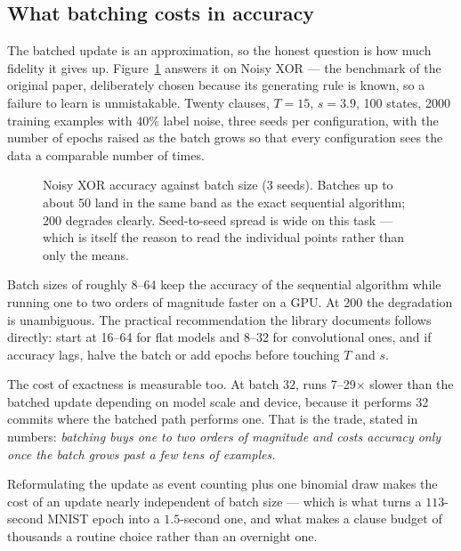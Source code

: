 \subsection{What batching costs in accuracy}
\label{sec:fidelity}

The batched update is an approximation, so the honest question is how much fidelity it gives
up. Figure~\ref{fig:bench-fidelity} answers it on Noisy XOR --- the benchmark of the original
paper, deliberately chosen because its generating rule is known, so a failure to learn is
unmistakable. Twenty clauses, $T=15$, $s=3.9$, 100 states, 2000 training examples with 40\%
label noise, three seeds per configuration, with the number of epochs raised as the batch grows
so that every configuration sees the data a comparable number of times.

\begin{figure}[htbp]
\centering

\caption{Noisy XOR accuracy against batch size (3 seeds). Batches up to about 50 land in the
  same band as the exact sequential algorithm; 200 degrades clearly. Seed-to-seed spread is
  wide on this task --- which is itself the reason to read the individual points rather than
  only the means.}
\label{fig:bench-fidelity}
\end{figure}

Batch sizes of roughly 8--64 keep the accuracy of the sequential algorithm while running one
to two orders of magnitude faster on a GPU. At 200 the degradation is unambiguous. The
practical recommendation the library documents follows directly: start at 16--64 for flat
models and 8--32 for convolutional ones, and if accuracy lags, halve the batch or add epochs
before touching $T$ and $s$.

The cost of exactness is measurable too. At batch 32,  runs
7--29$\times$ slower than the batched update depending on model scale and device, because it
performs 32 commits where the batched path performs one. That is the trade, stated in numbers:
\emph{batching buys one to two orders of magnitude and costs accuracy only once the batch
grows past a few tens of examples.}

\begin{ttkey}
Reformulating the update as event counting plus one binomial draw makes the cost of an update
nearly independent of batch size --- which is what turns a $113$-second MNIST epoch into a
$1.5$-second one, and what makes a clause budget of thousands a routine choice rather than an
overnight one.
\end{ttkey}
